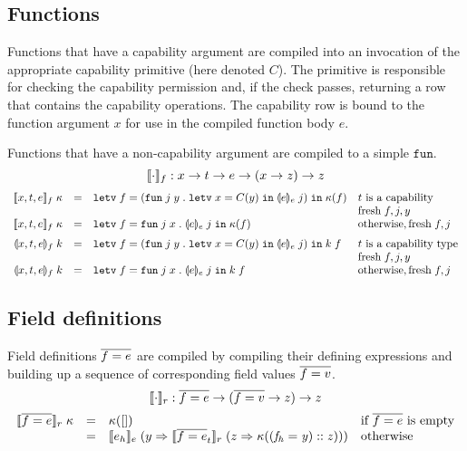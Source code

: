 \documentclass[11pt]{article}
\newcommand{\kw}[1]{\mathtt{#1}}
\begin{document}
\subsection*{Functions}

Functions that have a capability argument are compiled into an invocation of the appropriate capability primitive (here denoted $C$).
The primitive is responsible for checking the capability permission and, if the check passes, returning a row that contains the capability operations.
The capability row is bound to the function argument $x$ for use in the compiled function body $e$.

Functions that have a non-capability argument are compiled to a simple $\kw{fun}$.
\[
    \cmpn{f} : x -> t -> e -> (x -> z) -> z
\]
\[
\begin{array}{rclll}
\cmpk{f}{x, t, e} & = &
  \letv{f}{(\funv{j}{y}{\letv{x}{\prmv{C}{y}}{\tcmpin{e}{e}{j}}})}{\kappa(f)} &
  \text{$t$ is a capability} \\
  & & &  \fresh{f, j, y} \\
\cmpk{f}{x, t, e} & = &
  \letv{f}{\funv{j}{x}{\tcmpin{e}{e}{j}}}{\kappa(f)} & \text{otherwise}, \fresh{f, j} \medskip \\

\tcmpk{f}{x, t, e} & = &
  \letv{f}{(\funv{j}{y}{\letv{x}{\prmv{C}{y}}{\tcmpin{e}{e}{j}}})}{\appc{k}{f}} &
  \text{$t$ is a capability type} \\
  & & &  \fresh{f, j, y} \\
\tcmpk{f}{x, t, e} & = &
  \letv{f}{\funv{j}{x}{\tcmpin{e}{e}{j}}}{\appc{k}{f}} & \text{otherwise}, \fresh{f, j}
\end{array}
\]

\subsection*{Field definitions}

Field definitions $\flds{f}{e}$ are compiled by compiling their defining expressions and building up a sequence of corresponding field values $\flds{f}{v}$.
\[
    \cmpn{r} : \flds{f}{e} -> (\flds{f}{v} -> z) -> z
\]
\[
\begin{array}{rcll}
\cmpk{r}{\flds{f}{e}}
  & = & \kappa([]) & \text{if $\flds{f}{e}$ is empty} \\
  & = & \cmpin{e}{e_h}{(y =>
          \cmpin{r}{\flds{f}{e}_t}{(z =>
            \kappa(\cons{(\flde{f_h}{y})}{z}))})}
      & \text{otherwise} \\
\end{array}
\]
\end{document}
